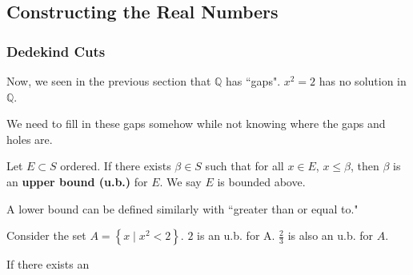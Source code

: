 \documentclass[../main.tex]{subfiles}
\begin{document}
\subsection{Constructing the Real Numbers}

\subsubsection{Dedekind Cuts}

Now, we seen in the previous section that \( \mathbb{Q} \) has ``gaps".
\( x^2 = 2 \) has no solution in \( \mathbb{Q} \).
\vspace{5mm}
\begin{center}
\end{center}

We need to fill in these gaps somehow while not knowing where the gaps and holes are.

\begin{definition}
    Let \( E \subset S \) ordered.
    If there exists \( \beta \in S \) such that for all \( x \in E \), \( x \leq \beta \),
    then \( \beta \) is an \textbf{upper bound (u.b.)} for \( E \).
    We say \( E \) is bounded above.
\end{definition}

A lower bound can be defined similarly with ``greater than or equal to."

\begin{example}[]
    Consider the set \( A = \left\{ x \mid x^2 < 2 \right\} \). \( 2 \) is an u.b. for A.
    \( \displaystyle \frac{2}{3} \) is also an u.b. for \( A \).
\end{example}

\begin{definition}[]
    If there exists an 
\end{definition}
\end{document}
